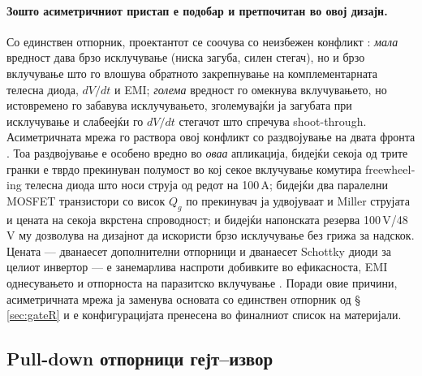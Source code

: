 \documentclass[11pt,a4paper]{article}
\newcommand{\eng}[1]{\textenglish{#1}}
\begin{document}
\paragraph{Зошто асиметричниот пристап е подобар и претпочитан во овој дизајн.} Со единствен отпорник, проектантот се соочува со неизбежен конфликт \cite{ref12,ref13}: \emph{мала} вредност дава брзо исклучување (ниска загуба, силен стегач), но и брзо вклучување што го влошува обратното закрепнување на комплементарната телесна диода, $dV/dt$ и EMI; \emph{голема} вредност го омекнува вклучувањето, но истовремено го забавува исклучувањето, зголемувајќи ја загубата при исклучување и слабеејќи го $dV/dt$ стегачот што спречува \eng{shoot-through}. Асиметричната мрежа го раствора овој конфликт со раздвојување на двата фронта \cite{ref12}. Тоа раздвојување е особено вредно во \emph{оваа} апликација, бидејќи секоја од трите гранки е тврдо прекинуван полумост во кој секое вклучување комутира \eng{freewheeling} телесна диода што носи струја од редот на 100\,A; бидејќи два паралелни MOSFET транзистори со висок $Q_g$ по прекинувач ја удвојуваат и \eng{Miller} струјата и цената на секоја вкрстена спроводност; и бидејќи напонската резерва 100\,V/48\,V му дозволува на дизајнот да искористи брзо исклучување без грижа за надскок. Цената --- дванаесет дополнителни отпорници и дванаесет \eng{Schottky} диоди за целиот инвертор --- е занемарлива наспроти добивките во ефикасноста, EMI однесувањето и отпорноста на паразитско вклучување \cite{ref12,ref13,ref14}. Поради овие причини, асиметричната мрежа ја заменува основата со единствен отпорник од \S\,\ref{sec:gateR} и е конфигурацијата пренесена во финалниот список на материјали.

\subsection{Pull-down отпорници гејт--извор}
\label{sec:pulldown}
\end{document}
